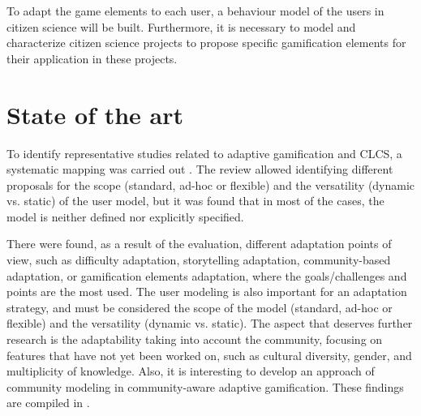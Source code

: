 \documentclass[sigconf]{acmart}
\begin{document}
To adapt the game elements to each user, a behaviour model of the users in citizen science will be built. Furthermore, it is necessary to model and characterize citizen science projects to propose specific gamification elements for their application in these projects.


\section{State of the art}


 

To identify representative studies related to adaptive gamification and CLCS, a systematic mapping
was carried out \cite{petersen_guidelines_2015}. The review allowed identifying different proposals for the scope (standard, ad-hoc or flexible) and the versatility (dynamic vs. static) of the user model, but it was found that in most of the cases, the model is neither defined nor explicitly specified. 

There were found, as a result of the evaluation, different adaptation points of view, such as difficulty adaptation, storytelling adaptation, community-based adaptation, or gamification elements adaptation, where the goals/challenges and points are the most used. The user modeling is also important for an adaptation strategy, and must be considered the scope of the model (standard, ad-hoc or flexible) and the versatility (dynamic vs. static). The aspect that deserves further research is the adaptability taking into account the community, focusing on features that have not yet been worked on, such as cultural diversity, gender, and multiplicity of knowledge. Also, it is interesting to develop an approach of community modeling in community-aware adaptive gamification. These findings are compiled in  \cite{ayastuy_adaptive_2021}.
\end{document}

